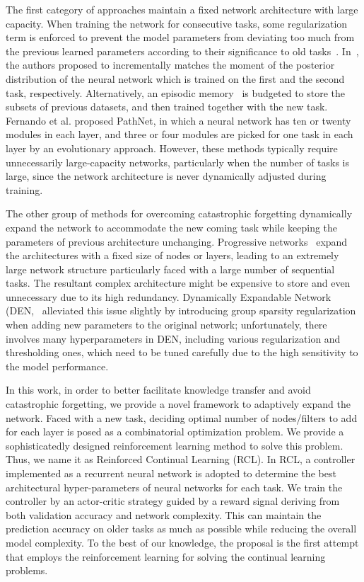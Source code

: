 \documentclass{article}
\begin{document}
The first category of approaches maintain a fixed network architecture with large capacity.  When training the network for consecutive tasks, some regularization term is enforced to prevent the model parameters from deviating too much
from the previous learned parameters according to their significance to old tasks~\cite{kirkpatrick1,zenke1}. In~\cite{lee2017overcoming}, the authors proposed to incrementally matches the moment of the posterior distribution of the neural network which is trained on the first and the second task, respectively. Alternatively, an episodic memory~\cite{GradientEpisodicMemory} is budgeted to store the subsets of previous datasets, and then trained together with the new task.
Fernando et al. \cite{fernando1} proposed PathNet, in which a neural network has ten or twenty modules in each layer, and three or four modules are picked for one task in each layer by an evolutionary approach.  However, these methods typically require unnecessarily large-capacity networks, particularly when the number of tasks is  large, since the network architecture is never dynamically adjusted during training.

The other group of methods for overcoming catastrophic forgetting dynamically expand the network to accommodate the new coming task while keeping the parameters of previous architecture unchanging. Progressive networks~\cite{rusu1} expand the architectures with a fixed size of nodes or layers, leading to an extremely large network structure particularly faced with a large number of sequential tasks. The resultant complex architecture might be expensive to store and even unnecessary due to its high redundancy. Dynamically Expandable Network (DEN,~\cite{yoon1} alleviated this issue slightly by introducing group sparsity regularization when adding new parameters to the original network; unfortunately, there involves many hyperparameters in DEN, including various regularization and thresholding ones, which need to be tuned carefully due to the high sensitivity to the model performance.


In this work, in order to  better facilitate knowledge transfer and avoid catastrophic forgetting, we provide a novel framework to adaptively expand the network. Faced with a new task, deciding optimal number of nodes/filters to add for each layer is posed as a combinatorial optimization problem. We provide a sophisticatedly designed reinforcement learning method to solve this problem. Thus, we name it as Reinforced Continual Learning (RCL). In RCL, a controller implemented as a recurrent neural network is adopted to determine the best architectural hyper-parameters of neural networks for each task. We train the controller by an actor-critic strategy guided by a reward signal deriving from both validation accuracy and network complexity. This can maintain the prediction accuracy on older tasks as much as possible while reducing the overall model complexity.  To the best of our knowledge, the proposal is the first attempt that employs the reinforcement learning for solving the continual learning problems.
\end{document}
